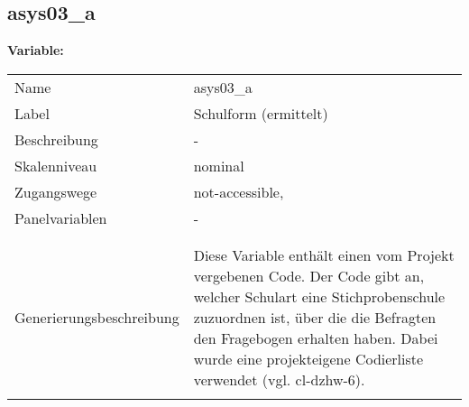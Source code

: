	
	
	\subsection{asys03\_a}
	\label{subSection:asys03_a}

	\noindent\textbf{Variable:}\\
		\begin{tabular}{lL{11.3cm}}
			\label{tableVariable:asys03_a}
			Name & asys03\_a \\
			Label & Schulform (ermittelt) \\
			Beschreibung & - \\
			Skalenniveau & nominal \\
			Zugangswege &
				not-accessible,
 \\
			Panelvariablen & -
			 \\
			 \\
 \\
					Generierungsbeschreibung & Diese Variable enthält einen vom Projekt vergebenen Code. Der Code gibt an, welcher Schulart eine Stichprobenschule zuzuordnen ist, über die die Befragten den Fragebogen erhalten haben. Dabei wurde eine projekteigene Codierliste verwendet (vgl. cl-dzhw-6).
				 \\	
			 \\
		\end{tabular}






	
	\newpage

